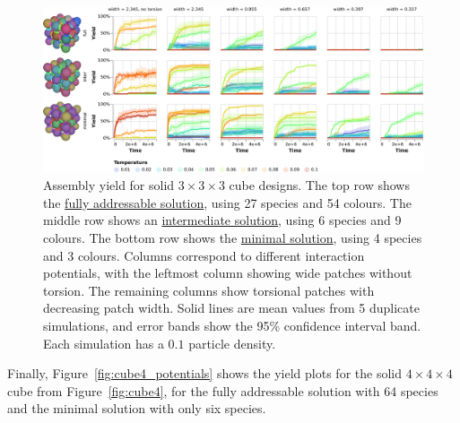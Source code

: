 \begin{figure}[h]
    \centering
    \includegraphics[width=\linewidth]{figures/patchysim/solidCubePotentials.eps}
    \caption{Assembly yield for solid \(3 \times 3 \times 3\) cube designs. The top row shows the \href{https://akodiat.github.io/polycubes/?decRule=|1:0||2:1||3:0_-1:2|4:0||5:1||6:0_|7:0|-2:1|8:1||9:0_|10:0||11:1|-3:2|12:0_-4:2|||13:1||14:0_-7:2|15:0|-5:1|16:1||17:0_-10:2|18:0||19:1|-6:2|20:0_-15:2||-13:1|21:1||22:0_-18:2|||23:1|-14:2|24:0_|25:0|-11:1|26:1|-9:2|27:0_|28:0||29:1|-12:2|_-25:2|30:0|-19:1|31:1|-17:2|32:0_-28:2|33:0||34:1|-20:2|_-30:2||-23:1|35:1|-22:2|36:0_-33:2|||37:1|-24:2|_|38:0|-29:1|39:1|-27:2|_-38:2|40:0|-34:1|41:1|-32:2|_-40:2||-37:1|42:1|-36:2|_|43:0|-8:1|||44:0_-43:2|45:0|-16:1|||46:0_-45:2||-21:1|||47:0_|48:0|-26:1||-44:2|49:0_-48:2|50:0|-31:1||-46:2|51:0_-50:2||-35:1||-47:2|52:0_|53:0|-39:1||-49:2|_-53:2|54:0|-41:1||-51:2|_-54:2||-42:1||-52:2|}{fully addressable solution}, using 27 species and 54 colours. The middle row shows an \href{https://akodiat.github.io/polycubes/?assemblyMode=stochastic&rule=10101113232391001d1d8c2400a2949495970c00a5001b1a1700009d0a8598008a000400}{intermediate solution}, using 6 species and 9 colours. The bottom row shows the \href{https://akodiat.github.io/polycubes/?assemblyMode=stochastic&rule=0a0a0b0a0908878784868b00060000078e8f000c0c00000e}{minimal solution}, using 4 species and 3 colours. Columns correspond to different interaction potentials, with the leftmost column showing wide patches without torsion. The remaining columns show torsional patches with decreasing patch width. Solid lines are mean values from 5 duplicate simulations, and error bands show the 95\% confidence interval band. Each simulation has a \(0.1\) particle density.}
    \label{fig:solidCubePotentials}
\end{figure}

Finally, Figure~\ref{fig:cube4_potentials} shows the yield plots for the solid \(4 \times 4 \times 4\) cube from Figure~\ref{fig:cube4}, for the fully addressable solution with 64 species and the minimal solution with only six species.

